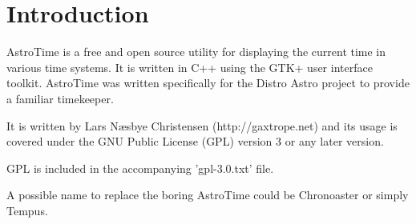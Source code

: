 \section{Introduction}
AstroTime is a free and open source utility for displaying the current time in various time systems. It is written in C++ using the GTK+ user interface toolkit.
AstroTime was written specifically for the Distro Astro project to provide a familiar timekeeper.

It is written by Lars Næsbye Christensen (http://gaxtrope.net) and its usage is covered under the GNU Public License (GPL) version 3 or any later version.

GPL is included in the accompanying 'gpl-3.0.txt' file.

A possible name to replace the boring AstroTime could be Chronoaster or simply Tempus.

